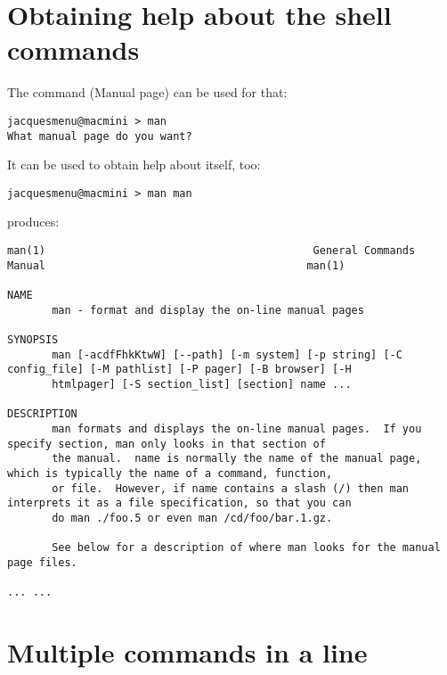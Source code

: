 \section{Obtaining help about the shell commands}

The  command (Manual page) can be used for that:
\begin{lstlisting}[language=Terminal]
jacquesmenu@macmini > man
What manual page do you want?
\end{lstlisting}

It can be used to obtain help about itself, too:
\begin{lstlisting}[language=Terminal]
jacquesmenu@macmini > man man
\end{lstlisting}

produces:
\begin{lstlisting}[language=Terminal]
man(1)                                          General Commands Manual                                         man(1)

NAME
       man - format and display the on-line manual pages

SYNOPSIS
       man [-acdfFhkKtwW] [--path] [-m system] [-p string] [-C config_file] [-M pathlist] [-P pager] [-B browser] [-H
       htmlpager] [-S section_list] [section] name ...

DESCRIPTION
       man formats and displays the on-line manual pages.  If you specify section, man only looks in that section of
       the manual.  name is normally the name of the manual page, which is typically the name of a command, function,
       or file.  However, if name contains a slash (/) then man interprets it as a file specification, so that you can
       do man ./foo.5 or even man /cd/foo/bar.1.gz.

       See below for a description of where man looks for the manual page files.
     
... ...
\end{lstlisting}


\section{Multiple commands in a line}

